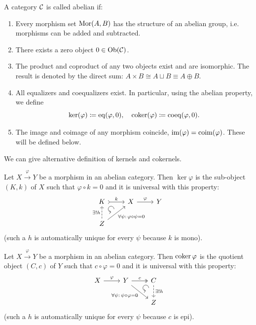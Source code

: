 \begin{defn}
    A category $\mathcal{C}$ is called abelian if:
    \begin{enumerate}
        \item Every morphism set $\operatorname{Mor}(A,B)$ has the structure of an abelian group, i.e. morphisms can be added and subtracted.
        \item There exists a zero object $0\in\operatorname{Ob}(\mathcal{C})$.
        \item The product and coproduct of any two objects exist and are isomorphic. The result is denoted by the direct sum: $A\times B\cong A\sqcup B \equiv A\oplus B$.
        \item All equalizers and coequalizers exist. In particular, using the abelian property, we define
        \[\ker (\varphi)\coloneqq\mathrm{eq}(\varphi,0),\quad \operatorname{coker}(\varphi)\coloneqq\mathrm{coeq}(\varphi,0).\]
        \item The image and coimage of any morphism coincide, $\operatorname{im} (\varphi)=\operatorname{coim}(\varphi)$. These will be defined below.
    \end{enumerate}
\end{defn}

We can give alternative definition of kernels and cokernels.
\begin{defn}[Kernel]
    Let $X\overset\varphi\to Y$ be a morphism in an abelian category. Then $\ker\varphi$ is the sub-object $(K,k)$ of $X$ such that $\varphi\circ k=0$ and it is universal with this property:
    \[\begin{tikzcd}[every matrix/.append style={name=m},   
        execute at end picture={\draw [<-] ([xshift=-10mm,yshift=-8mm]m-1-2.north) arc[start angle=-90,delta angle=-270,radius=0.15cm];}]
        K \arrow[r,tail,"k"]& X\arrow[r,"\varphi"] & Y\\
        Z\arrow[u,dashed,"\exists! h"]\arrow[ur,swap,"\forall\psi:\,\varphi\circ\psi=0"]& & 
    \end{tikzcd}\]
    (such a $h$ is automatically unique for every $\psi$ because $k$ is mono).
\end{defn}

\begin{defn}[Cokernel]
    Let $X\overset\varphi\to Y$ be a morphism in an abelian category. Then $\operatorname{coker}\varphi$ is the quotient object $(C,c)$ of $Y$ such that $c\circ\varphi=0$ and it is universal with this property:
    \[\begin{tikzcd}[every matrix/.append style={name=m},   
        execute at end picture={\draw [<-] ([xshift=-4mm,yshift=-8mm]m-1-3.north) arc[start angle=-90,delta angle=-270,radius=0.15cm];}]
        X\arrow[r,"\varphi"] & Y \arrow[r,two heads,"c"]\arrow[dr,swap,"\forall\psi:\,\psi\circ\varphi=0"]  & C\arrow[d,dashed,"\exists! h"] \\
        & & Z
    \end{tikzcd}\]
    (such a $h$ is automatically unique for every $\psi$ because $c$ is epi).
\end{defn}


